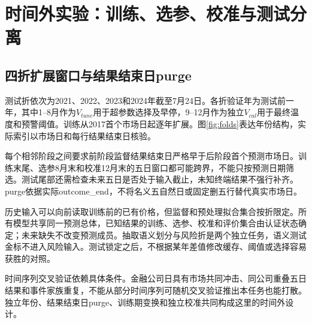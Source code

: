 \section{时间外实验：训练、选参、校准与测试分离}
\subsection{四折扩展窗口与结果结束日purge}
测试折依次为2021、2022、2023和2024年截至7月24日。各折验证年为测试前一年，其中1--8月作为$V_{tune}$用于超参数选择及早停，9--12月作为独立$V_{cal}$用于最终温度和预警阈值。训练从2017首个市场日起逐年扩展。图\ref{fig:folds}表达年份结构，实际索引以市场日和每行结果结束日核验。



每个相邻阶段之间要求前阶段监督结果结束日严格早于后阶段首个预测市场日。训练末尾、选参8月末和校准12月末的五日窗口都可能跨界，不能只按预测日期筛选。测试尾部还需检查未来五日是否处于输入截止，未知终端结果不强行补齐。purge依据实际outcome\_end，不将名义五自然日或固定删五行替代真实市场日。

历史输入可以向前读取训练前的已有价格，但监督和预处理拟合集合按折限定。所有模型共享同一预测总体，已知结果的训练、选参、校准和评价集合由认证状态确定；未来缺失不改变预测成员。抽取语义划分与风险折是两个独立任务，语义测试金标不进入风险输入。测试锁定之后，不根据某年差值修改缓存、阈值或选择容易获胜的对照。

时间序列交叉验证依赖具体条件\cite{r33}。金融公司日具有市场共同冲击、同公司重叠五日结果和事件家族重复，不能从部分时间序列可随机交叉验证推出本任务也能打散。独立年份、结果结束日purge、训练期变换和独立校准共同构成这里的时间外设计。

